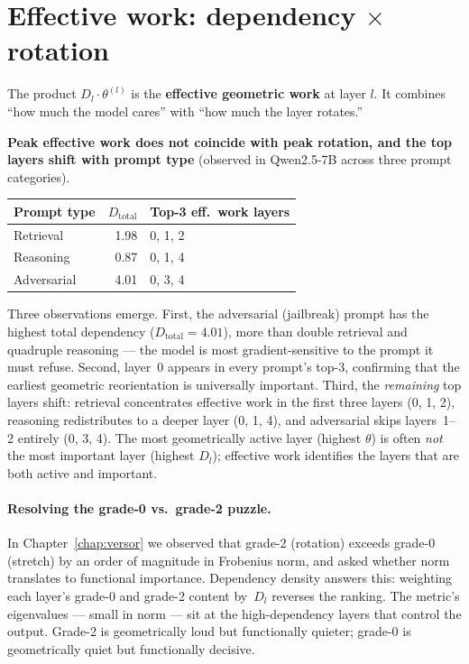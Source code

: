 \documentclass[11pt, twoside, openright]{memoir}
\numberwithin{equation}{chapter}
\begin{document}
\section{Effective work: dependency $\times$ rotation}

The product $D_l \cdot \theta^{(l)}$ is the \textbf{effective geometric
work} at layer $l$.  It combines ``how much the model cares'' with
``how much the layer rotates.''

\begin{finding}
\textbf{Peak effective work does not coincide with peak rotation,
and the top layers shift with prompt type}
(observed in Qwen2.5-7B across three prompt categories).

\medskip
\begin{center}
\renewcommand{\arraystretch}{1.3}\small
\begin{tabular}{@{} l r l @{}}
\toprule
\textbf{Prompt type} & $D_{\mathrm{total}}$ & \textbf{Top-3 eff.\ work layers} \\
\midrule
Retrieval   & 1.98 & 0, 1, 2 \\
Reasoning   & 0.87 & 0, 1, 4 \\
Adversarial & 4.01 & 0, 3, 4 \\
\bottomrule
\end{tabular}
\end{center}

\medskip
Three observations emerge.  First, the adversarial (jailbreak) prompt
has the highest total dependency ($D_{\mathrm{total}} = 4.01$), more
than double retrieval and quadruple reasoning --- the model is most
gradient-sensitive to the prompt it must refuse.  Second, layer~0
appears in every prompt's top-3, confirming that the earliest
geometric reorientation is universally important.  Third, the
\emph{remaining} top layers shift: retrieval concentrates effective
work in the first three layers (0, 1, 2), reasoning redistributes to
a deeper layer (0, 1, 4), and adversarial skips layers~1--2 entirely
(0, 3, 4).  The most geometrically active layer (highest $\theta$) is
often \emph{not} the most important layer (highest $D_l$); effective
work identifies the layers that are both active and important.
\end{finding}

\paragraph{Resolving the grade-0 vs.\ grade-2 puzzle.}
In Chapter~\ref{chap:versor} we observed that grade-2 (rotation)
exceeds grade-0 (stretch) by an order of magnitude in Frobenius norm,
and asked whether norm translates to functional importance.
Dependency density answers this: weighting each layer's grade-0 and
grade-2 content by~$D_l$ reverses the ranking.  The metric's
eigenvalues --- small in norm --- sit at the high-dependency layers
that control the output.  Grade-2 is geometrically loud but
functionally quieter; grade-0 is geometrically quiet but
functionally decisive.
\end{document}
